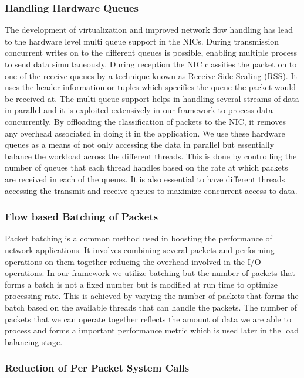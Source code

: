 \documentclass[conference]{IEEEtran}
\begin{document}
\subsubsection{Handling Hardware Queues}

The development of virtualization and improved network flow handling has lead to the hardware level multi queue support in the NICs. During transmission concurrent writes on to the different queues is possible, enabling multiple process to send data simultaneously. During reception the NIC classifies the packet on to one of the receive queues by a technique known as Receive Side Scaling (RSS). It uses the header information or tuples which specifies the queue the packet would be received at. The multi queue support helps in handling several streams of data in parallel and it is exploited extensively in our framework to process data concurrently. By offloading the classification of packets to the NIC, it removes any overhead associated in doing it in the application. We use these hardware queues as a means of not only accessing the data in parallel but essentially balance the workload across the different threads. This is done by controlling the number of queues that each thread handles based on the rate at which packets are received in each of the queues. It is also essential to have different threads accessing the transmit and receive queues to maximize concurrent access to data. 

\subsubsection{Flow based Batching of Packets}

Packet batching is a common method used in boosting the performance of network applications. It involves combining several packets and performing operations on them together reducing the overhead involved in the I/O operations. In our framework we utilize batching but the number of packets that forms a batch is not a fixed number but is modified at run time to optimize processing rate. This is achieved by varying the number of packets that forms the batch based on the available threads that can handle the packets. The number of packets that we can operate together reflects the amount of data we are able to process and forms a important performance metric which is used later in the load balancing stage.

\subsubsection{Reduction of Per Packet System Calls} 
\end{document}
